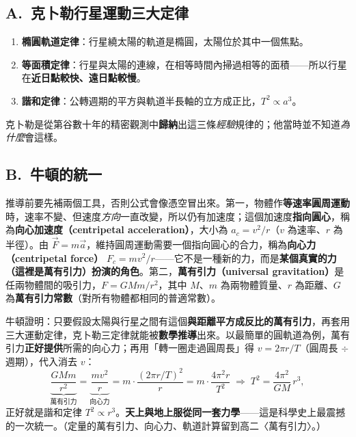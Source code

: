 \documentclass[11pt]{article}
\begin{document}
\subsection*{\sffamily A.\ 克卜勒行星運動三大定律}

\begin{enumerate}\setlength{\itemsep}{2pt}
\item \textbf{橢圓軌道定律}：行星繞太陽的軌道是橢圓，太陽位於其中一個焦點。
\item \textbf{等面積定律}：行星與太陽的連線，在相等時間內掃過相等的面積——所以行星在\textbf{近日點較快、遠日點較慢}。
\item \textbf{諧和定律}：公轉週期的平方與軌道半長軸的立方成正比，$T^2 \propto a^3$。
\end{enumerate}

克卜勒是從第谷數十年的精密觀測中\textbf{歸納}出這三條\textit{經驗}規律的；他當時並不知道\textit{為什麼}會這樣。


\subsection*{\sffamily B.\ 牛頓的統一}

推導前要先補兩個工具，否則公式會像憑空冒出來。第一，物體作\textbf{等速率圓周運動}時，速率不變、但速度\textit{方向}一直改變，所以仍有加速度；這個加速度\textbf{指向圓心}，稱為\textbf{向心加速度（centripetal acceleration）}，大小為 $a_c=v^2/r$（$v$ 為速率、$r$ 為半徑）。由 $\vec{F}=m\vec{a}$，維持圓周運動需要一個指向圓心的合力，稱為\textbf{向心力（centripetal force）} $F_c=mv^2/r$——它不是一種新的力，而是\textbf{某個真實的力（這裡是萬有引力）扮演的角色}。第二，\textbf{萬有引力（universal gravitation）}是任兩物體間的吸引力，$F=GMm/r^2$，其中 $M$、$m$ 為兩物體質量、$r$ 為距離、$G$ 為\textbf{萬有引力常數}（對所有物體都相同的普適常數）。

牛頓證明：只要假設太陽與行星之間有這個\textbf{與距離平方成反比的萬有引力}，再套用三大運動定律，克卜勒三定律就能被\textbf{數學推導}出來。以最簡單的圓軌道為例，萬有引力\textbf{正好提供}所需的向心力；再用「轉一圈走過圓周長」得 $v=2\pi r/T$（圓周長 $\div$ 週期），代入消去 $v$：
$$\underbrace{\frac{GMm}{r^2}}_{\text{萬有引力}}=\underbrace{\frac{mv^2}{r}}_{\text{向心力}}=m\cdot\frac{(2\pi r/T)^2}{r}=m\cdot\frac{4\pi^2 r}{T^2}\;\Longrightarrow\; T^2=\frac{4\pi^2}{GM}\,r^3,$$
正好就是諧和定律 $T^2\propto r^3$。\textbf{天上與地上服從同一套力學}——這是科學史上最震撼的一次統一。（定量的萬有引力、向心力、軌道計算留到高二〈萬有引力〉。）
\end{document}
